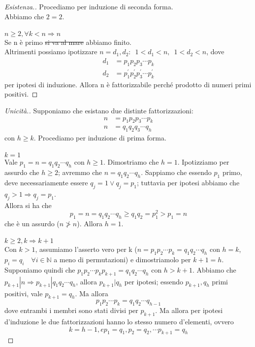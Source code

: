 \documentclass[12pt,twoside]{article}
\newcommand{\N}{\mathbb{N}}
\newcommand{\implica}{\Longrightarrow}
\newcommand{\pr}{\prime}
\renewcommand\qedsymbol{$\blacksquare$}
\newcommand{\baseinduz}[1]{\newline\newline {\boldmath$n = #1$}}
\newcommand{\induzdue}[1]{\\\\{\boldmath$n \ge #1, \forall k < n \implica n$}}
\begin{document}
\renewcommand\qedsymbol{$\square$}
\begin{proof}[Esistenza.]
Procediamo per induzione di seconda forma.
\baseinduz{2}
\\Abbiamo che $ 2 = 2 $.
\induzdue{2}
\\Se n è primo \sout{si va al mare} abbiamo finito.
\\Altrimenti possiamo ipotizzare $n = d_1, d_2 :\enspace1 < d_1 < n,\enspace1 < d_2 < n$, dove
\begin{align*}
d_1 &= p_1 p_2 p_3 \cdots p_k \\
 d_2 &= p^{\pr}_1 p^{\pr}_2 p^{\pr}_3 \cdots p^{\pr}_k
\end{align*}
 per ipotesi di induzione. Allora n è fattorizzabile perché prodotto di numeri primi positivi.
\end{proof}

\renewcommand\qedsymbol{$\blacksquare$}
\begin{proof}[Unicità.]
Supponiamo che esistano due distinte fattorizzazioni:
\begin{align*}
n &= p_1 p_2 p_3 \cdots p_k \\
n &= q_1 q_2 q_3 \cdots q_h
\end{align*}
con $h \ge k$. Procediamo per induzione di prima forma.
\\\\{\boldmath$k = 1$}
\\Vale $p_1 = n = q_1 q_2 \cdots q_h$ con $h \ge 1$. Dimostriamo che $h = 1$. Ipotizziamo per assurdo che $ h \ge 2$; avremmo che $ n = q_1 q_2 \cdots q_h$. Sappiamo che essendo $p_1$ primo, deve necessariamente essere $ q_j = 1 \lor q_j = p_1$; tuttavia per ipotesi abbiamo che $q_j > 1 \implica q_j = p_1$.
\\Allora si ha che
$$ p_1 = n = q_1 q_2 \cdots q_h \ge q_1 q_2 = p^2_1 > p_1 = n $$
che è un assurdo ($n \ngtr n$). Allora $h = 1$.
\\\\{\boldmath$k \ge 2, k \implica k+1$}
\\Con $ k > 1 $, assumiamo l'asserto vero per k ($n = p_1 p_2 \cdots p_k = q_1 q_2 \cdots q_h$ con $h = k$, $p_i = q_i \quad\forall i \in \N$ a meno di permutazioni) e dimostriamolo per $k + 1 = h$. Supponiamo quindi che $p_1 p_2 \cdots p_k p_{k+1} = q_1 q_2 \cdots q_h$ con $h > k + 1$. Abbiamo che $p_{k+1} | n \implica p_{k+1} | q_1 q_2 \cdots q_h$, allora $p_{k+1} | q_h$ per ipotesi; essendo $p_{k+1}, q_h$ primi positivi, vale $p_{k+1} = q_h$. Ma allora 
$$p_1 p_2 \cdots p_k = q_1 q_2 \cdots q_{h-1} $$
dove entrambi i membri sono stati divisi per $p_{k+1}$. Ma allora per ipotesi d'induzione le due fattorizzazioni hanno lo stesso numero d'elementi, ovvero 
$$k = h - 1, e p_1 = q_1, p_2 = q_2, \cdots p_{k+1} = q_h$$
\end{proof}
\end{document}
